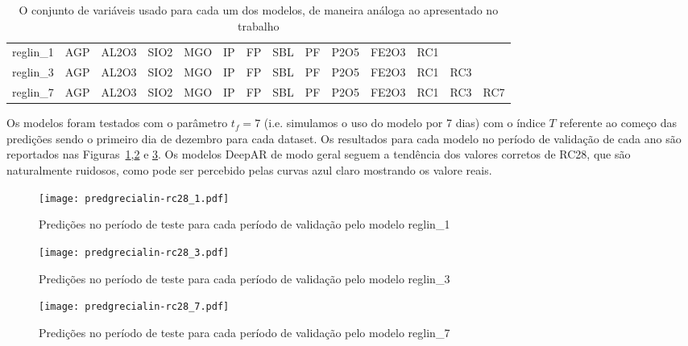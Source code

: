 \begin{table}[]
\centering 
\begin{tabular}{llllllllllllll}
\toprule
reglin\_1 &  AGP &  AL2O3 &  SIO2 &  MGO &  IP &  FP &  SBL &  PF &  P2O5 &  FE2O3 &  RC1 &      &      \\
reglin\_3 &  AGP &  AL2O3 &  SIO2 &  MGO &  IP &  FP &  SBL &  PF &  P2O5 &  FE2O3 &  RC1 &  RC3 &      \\
reglin\_7 &  AGP &  AL2O3 &  SIO2 &  MGO &  IP &  FP &  SBL &  PF &  P2O5 &  FE2O3 &  RC1 &  RC3 &  RC7 \\
\bottomrule
\end{tabular}
\caption{O conjunto de variáveis usado para cada um dos modelos, de maneira análoga ao apresentado no trabalho \cite{grecialin}}
\label{tab:modelslin}
\end{table}


Os modelos foram testados com o parâmetro $t_f = 7$ (i.e. simulamos o uso do
modelo por 7 dias) com o índice $T$ referente
ao começo das predições sendo o primeiro dia de dezembro para cada dataset.
Os resultados para cada modelo no período de validação de cada ano são
reportados nas Figuras~\ref{fig:rc281preds},\ref{fig:rc283preds} e
\ref{fig:rc287preds}. Os modelos DeepAR de modo geral seguem a tendência dos
valores corretos de RC28, que são naturalmente ruidosos, como pode ser
percebido pelas curvas azul claro mostrando os valore reais. 

\begin{figure}[H]
  \centering
  \texttt{[image: predgrecialin-rc28\_1.pdf]}
  \caption{Predições no período de teste para cada período de validação pelo
    modelo reglin\_1}
  \label{fig:rc281preds}
\end{figure}

\begin{figure}[H]
  \centering
  \texttt{[image: predgrecialin-rc28\_3.pdf]}
  \caption{Predições no período de teste para cada período de validação pelo
    modelo reglin\_3}
  \label{fig:rc283preds}

\end{figure}
\begin{figure}[H]
  \centering
  \texttt{[image: predgrecialin-rc28\_7.pdf]}
  \caption{Predições no período de teste para cada período de validação pelo
    modelo reglin\_7}
  \label{fig:rc287preds}

\end{figure}

